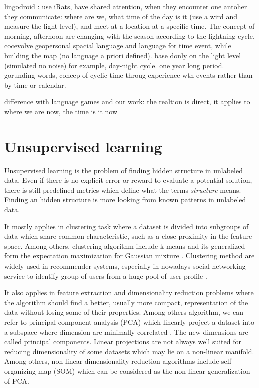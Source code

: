 lingodroid \cite{schulz2010robots} : use iRats, have shared attention, when they encounter one antoher they communicate: where are we, what time of the day is it (use a wird and measure the light level), and meet-at a location at a specific time. The concept of morning, afternoon are changing with the season according to the lightning cycle. \cite{schulz2011lingodroids}
\cite{heath2012long} cocevolve geopersonal spacial language and language for time event, while building the map (no language a priori defined). base donly on the light level (simulated no noise) for example, day-night cycle. one year long period. gorunding words, concep of cyclic time throug experience wth events rather than by time or calendar.


difference with language games and our work: the realtion is direct, it applies to where we are now, the time is it now


\section{Unsupervised learning}

Unsupervised learning is the problem of finding hidden structure in unlabeled data. Even if there is no explicit error or reward to evaluate a potential solution, there is still predefined metrics which define what the terms \emph{structure} means. Finding an hidden structure is more looking from known patterns in unlabeled data.

It mostly applies in clustering task where a dataset is divided into subgroups of data which share common characteristic, such as a close proximity in the feature space. Among others, clustering algorithm include k-means and its generalized form the expectation maximization for Gaussian mixture \cite{dempster1977maximum}. Clustering method are widely used in recommender systems, especially in nowadays social networking service to identify group of users from a huge pool of user profile \cite{sarwar2002recommender}.

It also applies in feature extraction and dimensionality reduction problems where the algorithm should find a better, usually more compact, representation of the data without losing some of their properties. Among others algorithm, we can refer to principal component analysis (PCA) which linearly project a dataset into a subspace where dimension are minimally correlated \cite{jolliffe2005principal}. The new dimensions are called principal components. Linear projections are not always well suited for reducing dimensionality of some datasets which may lie on a non-linear manifold. Among others, non-linear dimensionality reduction algorithms include self-organizing map (SOM) \cite{kohonen2001self} which can be considered as the non-linear generalization of PCA.

